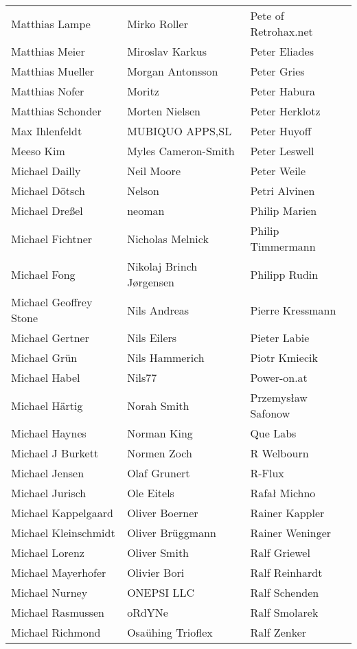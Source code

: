 \begin{tabular}{p{4.5cm}p{4.5cm}p{4.5cm}}
Matthias Lampe & Mirko Roller & Pete of Retrohax.net \\
Matthias Meier & Miroslav Karkus & Peter Eliades \\
Matthias Mueller & Morgan Antonsson & Peter Gries \\
Matthias Nofer & Moritz & Peter Habura \\
Matthias Schonder & Morten Nielsen & Peter Herklotz \\
Max Ihlenfeldt & MUBIQUO APPS,SL & Peter Huyoff \\
Meeso Kim & Myles Cameron-Smith & Peter Leswell \\
Michael Dailly & Neil Moore & Peter Weile \\
Michael Dötsch & Nelson & Petri Alvinen \\
Michael Dreßel & neoman & Philip Marien \\
Michael Fichtner & Nicholas Melnick & Philip Timmermann \\
Michael Fong & Nikolaj Brinch Jørgensen & Philipp Rudin \\
Michael Geoffrey Stone & Nils Andreas & Pierre Kressmann \\
Michael Gertner & Nils Eilers & Pieter Labie \\
Michael Grün & Nils Hammerich & Piotr Kmiecik \\
Michael Habel & Nils77 & Power-on.at \\
Michael Härtig & Norah Smith & Przemysław Safonow \\
Michael Haynes & Norman King & Que Labs \\
Michael J Burkett & Normen Zoch & R Welbourn \\
Michael Jensen & Olaf Grunert & R-Flux \\
Michael Jurisch & Ole Eitels & Rafał Michno \\
Michael Kappelgaard & Oliver Boerner & Rainer Kappler \\
Michael Kleinschmidt & Oliver Brüggmann & Rainer Weninger \\
Michael Lorenz & Oliver Smith & Ralf Griewel \\
Michael Mayerhofer & Olivier Bori & Ralf Reinhardt \\
Michael Nurney & ONEPSI LLC & Ralf Schenden \\
Michael Rasmussen & oRdYNe & Ralf Smolarek \\
Michael Richmond & Osaühing Trioflex & Ralf Zenker \\

\end{tabular}
